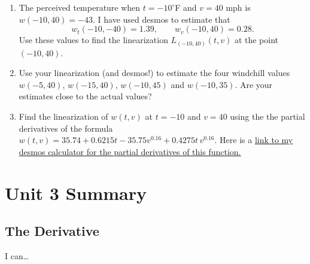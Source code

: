 \documentclass[
]{book}
\begin{document}
\begin{enumerate}
\def\labelenumi{\arabic{enumi}.}
\item
  The perceived temperature when \(t=-10 ^\circ\)F and \(v=40\) mph is \(w(-10,40)=-43\). I have used desmos to estimate that
  \[
  w_t(-10,-40) = 1.39, \qquad w_v(-10,40)=0.28.
  \]
  Use these values to find the linearization \(L_{(-10,40)}(t,v)\) at the point \((-10,40)\).
\item
  Use your linearization (and desmos!) to estimate the four windchill values \(w(-5,40)\), \(w(-15,40)\), \(w(-10,45)\) and \(w(-10,35)\). Are your estimates close to the actual values?
\item
  Find the linearization of \(w(t,v)\) at \(t=-10\) and \(v=40\) using the
  the partial derivatives of the formula \(w(t,v) = 35.74+0.6215 t-35.75 v^{0.16}+0.4275 t \, v^{0.16}\). Here is a \href{https://www.desmos.com/calculator/dvuhpknthj}{link to my desmos calculator for the partial derivatives of this function.}
\end{enumerate}

\hypertarget{unit-3-summary}{%
\chapter{Unit 3 Summary}\label{unit-3-summary}}

\hypertarget{the-derivative-2}{%
\section{The Derivative}\label{the-derivative-2}}

I can\ldots{}
\end{document}
